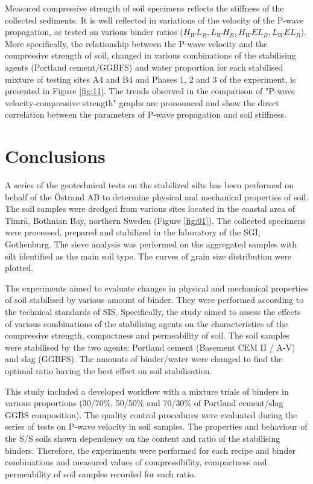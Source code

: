 \documentclass{amestyle}
\begin{document}
Measured compressive strength of soil specimens reflects the stiffness of the collected sediments. It is well reflected in variations of the velocity of the P-wave propagation, as tested on various binder ratios ($H_WL_B, L_WH_B, H_WEL_B, L_WEL_B$). More specifically, the relationship between the P-wave velocity and the compressive strength of soil, changed in various combinations of the stabilising agents (Portland cement/GGBFS) and water proportion for each stabilised mixture of testing sites A4 and B4 and Phases 1, 2 and 3 of the experiment, is presented in Figure \ref{fig:11}. The trends observed in the comparison of "P-wave velocity-compressive strength" graphs are pronounced and show the direct correlation between the parameters of P-wave propagation and soil stiffness. 

\section{Conclusions}
\label{sec:conclusions}

A series of the geotechnical tests on the stabilized silts has been performed on behalf of the Östrand AB to determine physical and mechanical properties of soil. The soil samples were dredged from various sites located in the coastal area of Timrå, Bothnian Bay, northern Sweden (Figure \ref{fig:01}). The collected specimens were processed, prepared and stabilized in the laboratory of the SGI, Gothenburg. The sieve analysis was performed on the aggregated samples with silt identified as the main soil type. The curves of grain size distribution were plotted. 

The experiments aimed to evaluate changes in physical and mechanical properties of soil stabilised by various amount of binder. They were performed according to the technical standards of SIS. Specifically, the study aimed to assess the effects of various combinations of the stabilising agents on the characteristics of the compressive strength, compactness and permeability of soil. The soil samples were stabilised by the two agents: Portland cement (Basement CEM II / A-V) and slag (GGBFS). The amounts of binder/water were changed to find the optimal ratio having the best effect on soil stabilisation. 

This study included a developed workflow with a mixture trials of binders in various proportions (30/70\%, 50/50\% and 70/30\% of Portland cement/slag GGBS composition). The quality control procedures were evaluated during the series of  tests on P-wave velocity in soil samples. The properties and behaviour of the S/S soils shown dependency on the content and ratio of the stabilising binders. Therefore, the experiments were performed for each recipe and binder combinations and measured values of compressibility, compactness and permeability of soil samples recorded for each ratio. 
\end{document}
